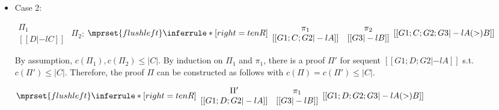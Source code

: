 \begin{itemize}
\item Case 2:
      \begin{center}
        \scriptsize
        \begin{math}
          \begin{array}{c}
            \Pi_1 \\
            {[[D |-l C]]}
          \end{array}
        \end{math}
        \qquad\qquad
        $\Pi_2$:
        \begin{math}
          $$\mprset{flushleft}
          \inferrule* [right={\tiny tenR}] {
            {
              \begin{array}{cc}
                \pi_1 & \pi_2 \\
                {[[G1; C; G2 |-l A]]} & {[[G3 |-l B]]}
              \end{array}
            }
          }{[[G1; C; G2; G3 |-l A (>) B]]}
        \end{math}
      \end{center}
      By assumption, $c(\Pi_1),c(\Pi_2)\leq |C|$. By induction on $\Pi_1$
      and $\pi_1$, there is a proof $\Pi'$ for sequent
      $[[G1; D; G2 |-l A]]$ s.t. $c(\Pi') \leq |C|$. Therefore, the proof
      $\Pi$ can be constructed as follows with $c(\Pi) = c(\Pi') \leq |C|$.
      \begin{center}
        \scriptsize
        \begin{math}
          $$\mprset{flushleft}
          \inferrule* [right={\tiny tenR}] {
            {
              \begin{array}{cc}
                \Pi' & \pi_1 \\
                {[[G1; D; G2 |-l A]]} & {[[G3 |-l B]]}
              \end{array}
            }
          }{[[G1; D; G2; G3 |-l A (>) B]]}
        \end{math}
      \end{center}


\end{itemize}
